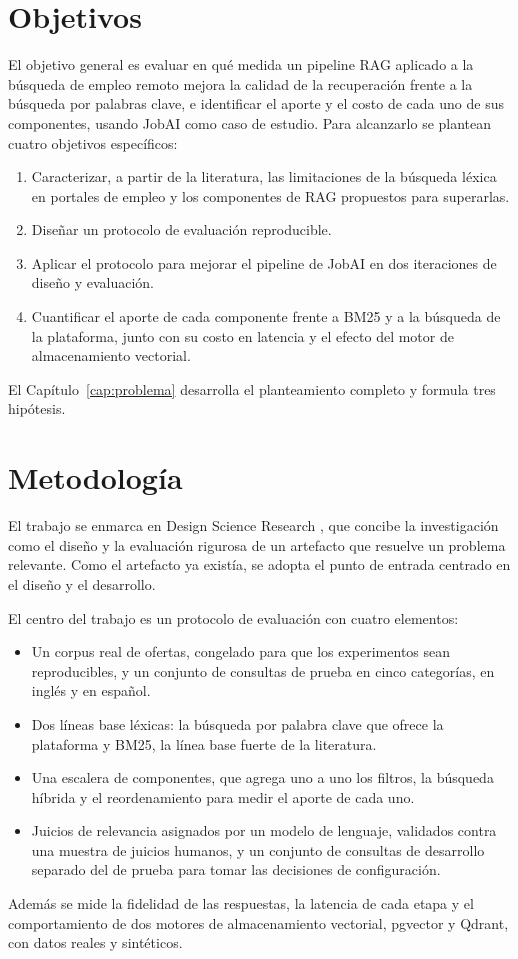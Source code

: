 \section*{Objetivos}

El objetivo general es evaluar en qué medida un pipeline RAG aplicado a la búsqueda de empleo remoto mejora la calidad de la recuperación frente a la búsqueda por palabras clave, e identificar el aporte y el costo de cada uno de sus componentes, usando JobAI como caso de estudio. Para alcanzarlo se plantean cuatro objetivos específicos:
\begin{enumerate}
    \item Caracterizar, a partir de la literatura, las limitaciones de la búsqueda léxica en portales de empleo y los componentes de RAG propuestos para superarlas.
    \item Diseñar un protocolo de evaluación reproducible.
    \item Aplicar el protocolo para mejorar el pipeline de JobAI en dos iteraciones de diseño y evaluación.
    \item Cuantificar el aporte de cada componente frente a BM25 y a la búsqueda de la plataforma, junto con su costo en latencia y el efecto del motor de almacenamiento vectorial.
\end{enumerate}
El Capítulo~\ref{cap:problema} desarrolla el planteamiento completo y formula tres hipótesis.

\section*{Metodología}

El trabajo se enmarca en Design Science Research \citep{Hevner2004,Peffers2007}, que concibe la investigación como el diseño y la evaluación rigurosa de un artefacto que resuelve un problema relevante. Como el artefacto ya existía, se adopta el punto de entrada centrado en el diseño y el desarrollo.

El centro del trabajo es un protocolo de evaluación con cuatro elementos:
\begin{itemize}
    \item Un corpus real de ofertas, congelado para que los experimentos sean reproducibles, y un conjunto de consultas de prueba en cinco categorías, en inglés y en español.
    \item Dos líneas base léxicas: la búsqueda por palabra clave que ofrece la plataforma y BM25, la línea base fuerte de la literatura.
    \item Una escalera de componentes, que agrega uno a uno los filtros, la búsqueda híbrida y el reordenamiento para medir el aporte de cada uno.
    \item Juicios de relevancia asignados por un modelo de lenguaje, validados contra una muestra de juicios humanos, y un conjunto de consultas de desarrollo separado del de prueba para tomar las decisiones de configuración.
\end{itemize}
Además se mide la fidelidad de las respuestas, la latencia de cada etapa y el comportamiento de dos motores de almacenamiento vectorial, pgvector y Qdrant, con datos reales y sintéticos.

